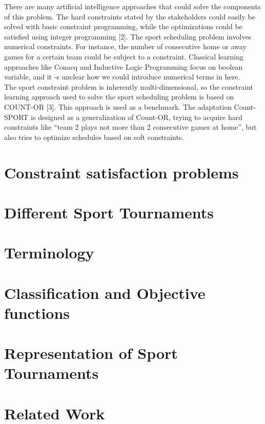 \documentclass[12pt]{report}
\begin{document}
There are many artificial intelligence approaches that could solve the components of this problem. The hard constraints stated by the stakeholders could easily be solved with basic constraint programming, while the optimizations could be satisfied using integer programming [2]. The sport scheduling problem involves numerical constraints. For instance, the number of consecutive home or away games for a certain team could be subject to a constraint.  Classical learning approaches like Conacq and Inductive Logic Programming focus on boolean variable, and it -s unclear how we could introduce numerical terms in here.
\\[5px]
The sport constraint problem is inherently multi-dimensional, so the constraint learning approach used to solve the sport scheduling problem is based on COUNT-OR [3]. This approach is used as a benchmark. The adaptation Count-SPORT is designed as a generalization of Count-OR, trying to acquire hard constraints like “team 2 plays not more than 2 consecutive games at home”, but also tries to optimize schedules based on soft constraints.



\chapter{Constraint satisfaction problems}


\chapter{Different Sport Tournaments}


\chapter{Terminology}


\chapter{Classification and Objective functions}


\chapter{Representation of Sport Tournaments}


\chapter{Related Work}

\end{document}
